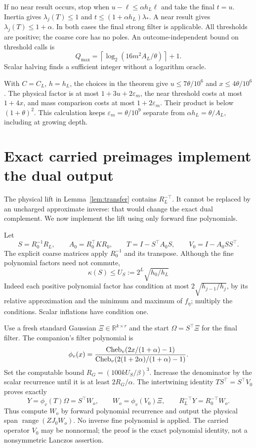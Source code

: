 \documentclass[11pt]{article}
\newcommand{\R}{\mathbb R}
\newcommand{\range}{\operatorname{range}}
\begin{document}
If no near result occurs, stop when \(u-\ell\leq\alpha h_L\ell\)
and take the final \(t=u\). Inertia gives \(\lambda_j(T)\leq1\)
and \(t\leq(1+\alpha h_L)\lambda_*\). A near result gives
\(\lambda_j(T)\leq1+\alpha\). In both cases the final strong filter
is applicable. All thresholds are positive; the coarse core has no poles.
An outcome-independent bound on threshold calls is
\begin{equation}\label{eq:Qcap}
 Q_{\max}=\left\lceil\log_2(16m^2 A_L/\theta)\right\rceil+1.
\end{equation}
Scalar halving finds a sufficient integer without a logarithm oracle.

With \(C=C_L\), \(h=h_L\), the choices in the theorem give
\(u\leq7\theta/10^6\) and \(x\leq4\theta/10^6\).
The physical factor is at most \(1+3u+2\varepsilon_m\), the near
threshold costs at most \(1+4x\), and mass comparison costs at most
\(1+2\varepsilon_m\). Their product is below \((1+\theta)^2\).
This calculation keeps \(\varepsilon_m=\theta/10^9\) separate from
\(\alpha h_L=\theta/A_L\), including at growing depth.

\section{Exact carried preimages implement the dual output}
The physical lift in Lemma~\ref{lem:transfer} contains \(R_L^{-\top}\).
It cannot be replaced by an uncharged approximate inverse: that would
change the exact dual complement. We now implement the lift using only
forward fine polynomials.

Let
\[
 S=R_0^{-1}R_L,\qquad A_0=R_0^\top KR_0,\qquad
 T=I-S^\top A_0S,\qquad V_0=I-A_0SS^\top.
\]
The explicit coarse matrices apply \(R_0^{-1}\) and its transpose.
Although the fine polynomial factors need not commute,
\begin{equation}\label{eq:Scond}
\kappa(S)\leq U_S:=2^L\sqrt{h_0/h_L}
\end{equation}
Indeed each positive polynomial factor has condition at most
\(2\sqrt{h_{j-1}/h_j}\), by its relative approximation and the
minimum and maximum of \(f_\eta\); multiply the conditions.
Scalar inflations have condition one.

Use a fresh standard Gaussian \(\Xi\in\R^{k\times r}\) and the
start \(\Omega=S^\top\Xi\) for the final filter. The companion's
filter polynomial is
\[
 \phi_v(x)=\frac{{\rm Cheb}_v(2x/(1+\alpha)-1)}
 {{\rm Cheb}_v(2(1+2\alpha)/(1+\alpha)-1)}.
\]
Set the computable bound \(R_G=(100kU_S/\beta)^3\). Increase the
denominator by the scalar recurrence until it is at least \(2R_G/\alpha\).
The intertwining identity
\(TS^\top=S^\top V_0\) proves exactly
\begin{equation}\label{eq:preimage}
 Y=\phi_v(T)\Omega=S^\top W_o,\qquad
 W_o=\phi_v(V_0)\Xi,\qquad
 R_L^{-\top}Y=R_0^{-\top}W_o.
\end{equation}
Thus compute \(W_o\) by forward polynomial recurrence and output the
physical span \(\range(ZJ_0W_o)\). No inverse fine polynomial is applied.
The carried operator \(V_0\) may be nonnormal; the proof is the exact
polynomial identity, not a nonsymmetric Lanczos assertion.
\end{document}
